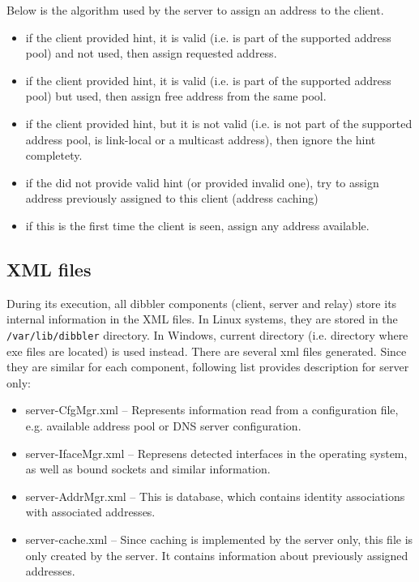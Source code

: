 Below is the algorithm used by the server to assign an address to the client.

\begin{itemize}
 \item if the client provided hint, it is valid (i.e. is part of the
       supported address pool) and not used, then assign requested address.
 \item if the client provided hint, it is valid (i.e. is part of the
       supported address pool) but used, then assign free address from
       the same pool.
 \item if the client provided hint, but it is not valid (i.e. is not
       part of the supported address pool, is link-local or a multicast
       address), then ignore the hint completety.
 \item if the did not provide valid hint (or provided invalid one), try
       to assign address previously assigned to this client (address caching)
 \item if this is the first time the client is seen, assign any address
       available.
\end{itemize}


\subsection{XML files}
\label{feature-xml}
During its execution, all dibbler components (client, server and
relay) store its internal information in the XML files. In Linux
systems, they are stored in the \verb+/var/lib/dibbler+ directory. In
Windows, current directory (i.e. directory where exe files are
located) is used instead. There are several xml files generated. Since
they are similar for each component, following list provides
description for server only:

\begin{itemize}
\item server-CfgMgr.xml -- Represents information read from a
  configuration file, e.g. available address pool or DNS server
      configuration.
\item server-IfaceMgr.xml -- Represens detected interfaces in the
  operating system, as well as bound sockets and similar information.
\item server-AddrMgr.xml -- This is database, which contains identity
  associations with associated addresses.
 \item server-cache.xml -- Since caching is implemented by the server
      only, this file is only created by the server. It contains
      information about previously assigned addresses.
\end{itemize}


